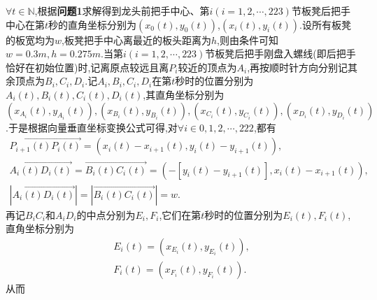 \documentclass[lang=cn,newtx,10pt,scheme=chinese]{../Template/elegantbook}
\begin{document}
$\forall t\in \mathbb{N}$,根据\textbf{问题1}求解得到龙头前把手中心、第$i(i=1,2,\cdots,223)$节板凳后把手中心在第$t$秒的直角坐标分别为$(x_0(t),y_0(t))$,$(x_i(t),y_i(t))$.设所有板凳的板宽均为$w$,板凳把手中心离最近的板头距离为$h$,则由条件可知$w=0.3m,h=0.275m$.当第$i(i=1,2,\cdots,223)$节板凳后把手刚盘入螺线(即后把手恰好在初始位置)时,记离原点较远且离$P_i$较近的顶点为$A_i$,再按顺时针方向分别记其余顶点为$B_i,C_i,D_i$.记$A_i,B_i,C_i,D_i$在第$t$秒时的位置分别为$A_i(t),B_i(t),C_i(t),D_i(t)$,其直角坐标分别为$(x_{A_i}(t),y_{A_i}(t)),(x_{B_i}(t),y_{B_i}(t)),(x_{C_i}(t),y_{C_i}(t)),(x_{D_i}(t),y_{D_i}(t))$.于是根据向量垂直坐标变换公式可得,对$\forall i\in {0,1,2,\cdots,222}$,都有
\begin{gather}
\overrightarrow{P_{i+1}\left( t \right) P_i\left( t \right) }=\left( x_i\left( t \right) -x_{i+1}\left( t \right) ,y_i\left( t \right) -y_{i+1}\left( t \right) \right) ,\label{problem-2.1}
\\
\overrightarrow{A_i\left( t \right) D_i\left( t \right) }=\overrightarrow{B_i\left( t \right) C_i\left( t \right) }=\left( -\left[ y_i\left( t \right) -y_{i+1}\left( t \right) \right] ,x_i\left( t \right) -x_{i+1}\left( t \right) \right) ,\label{problem-2.2}
\\
\left| \overrightarrow{A_i\left( t \right) D_i\left( t \right) } \right|=\left| \overrightarrow{B_i\left( t \right) C_i\left( t \right) } \right|=w.\label{problem-2.3}
\end{gather}
再记$B_iC_i$和$A_iD_i$的中点分别为$E_i,F_i$,它们在第$t$秒时的位置分别为$E_i(t),F_i(t)$,直角坐标分别为
\begin{align}
E_i(t)=(x_{E_i}(t),y_{E_i}(t)),
\\
F_i(t)=(x_{F_i}(t),y_{F_i}(t)).
\end{align}
从而
\end{document}
